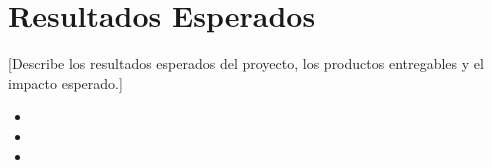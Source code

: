 \section{Resultados Esperados}
\label{sec:resultados}

[Describe los resultados esperados del proyecto, los productos entregables y el impacto esperado.]

\begin{itemize}
    \item [Resultado esperado 1]
    \item [Resultado esperado 2]
    \item [Resultado esperado 3]
\end{itemize}
